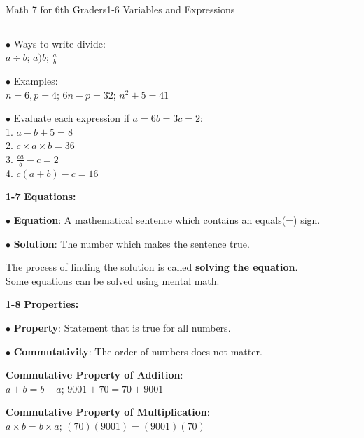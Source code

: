 \begin{enumerate*}
\begin{enumerate*}
\newpage
\noindent\Large{Math 7 for 6th Graders\hfill 1-6 Variables and Expressions}
\noindent\hrule
\vspace{5mm}
			
			\item[$\bullet$]Ways to write divide:\\
				$a\div b$; $a\overline{)b}$; $\frac{a}{b}$\\
			\item[$\bullet$]Examples:\\
				$n=6, p=4$; $6n-p=32$; $n^2+5=41$\\
			 \item[$\bullet$]Evaluate each expression if $a=6 b=3 c=2$:\\
			 	1. $a-b+5=8$\\
			 	2. $c\times a\times b=36$\\
			 	3. $\frac{ca}{b}-c=2$\\
			 	4. $c(a+b)-c=16$\\			
			\end{enumerate*}
			
		\item[\Large\textbf{1-7}] \Large\textbf{Equations:}\\
			\begin{enumerate*}
				\item[$\bullet$]\textbf{Equation}: A mathematical sentence which contains an equals(=) sign.\\
				\item[$\bullet$]\textbf{Solution}: The number which makes the sentence true.\\
				\item[] The process of finding the solution is called \textbf{solving the equation}.\\
					Some equations can be solved using mental math.\\
			\end{enumerate*}
			
		\item[\Large\textbf{1-8}] \Large\textbf{Properties:}\\
			\begin{enumerate*}
				\item[$\bullet$]\textbf{Property}: Statement that is true for all numbers.\\
				\item[$\bullet$]\textbf{Commutativity}: The order of numbers does not matter.\\
					\item[]\textbf{Commutative Property of Addition}:\\
						$a+b=b+a$; $9001+70=70+9001$\\
					\item[]\textbf{Commutative Property of Multiplication}:\\
						$a\times b=b\times a$; $(70)(9001)=(9001)(70)$\\
					

\end{enumerate*}
\end{enumerate*}
